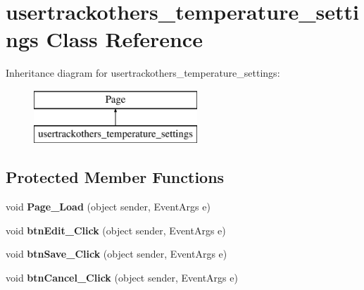 \hypertarget{classusertrackothers__temperature__settings}{\section{usertrackothers\-\_\-temperature\-\_\-settings Class Reference}
\label{classusertrackothers__temperature__settings}
}
Inheritance diagram for usertrackothers\-\_\-temperature\-\_\-settings\-:\begin{figure}[H]
\begin{center}
\leavevmode
\includegraphics[height=2.000000cm]{classusertrackothers__temperature__settings}
\end{center}
\end{figure}
\subsection*{Protected Member Functions}
\begin{DoxyCompactItemize}
\item 
\hypertarget{classusertrackothers__temperature__settings_a65f4511b4340df6d7012ebae93d4d1c6}{void {\bfseries Page\-\_\-\-Load} (object sender, Event\-Args e)}\label{classusertrackothers__temperature__settings_a65f4511b4340df6d7012ebae93d4d1c6}

\item 
\hypertarget{classusertrackothers__temperature__settings_a782373f2ae2b2678b5e9cebde99b5d81}{void {\bfseries btn\-Edit\-\_\-\-Click} (object sender, Event\-Args e)}\label{classusertrackothers__temperature__settings_a782373f2ae2b2678b5e9cebde99b5d81}

\item 
\hypertarget{classusertrackothers__temperature__settings_a390c9586e742db597ce2ffbbe9f76716}{void {\bfseries btn\-Save\-\_\-\-Click} (object sender, Event\-Args e)}\label{classusertrackothers__temperature__settings_a390c9586e742db597ce2ffbbe9f76716}

\item 
\hypertarget{classusertrackothers__temperature__settings_aef80ee5a16d7cb9de18d12e4eafd6f4a}{void {\bfseries btn\-Cancel\-\_\-\-Click} (object sender, Event\-Args e)}\label{classusertrackothers__temperature__settings_aef80ee5a16d7cb9de18d12e4eafd6f4a}

\end{DoxyCompactItemize}


